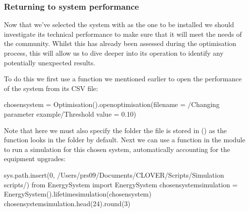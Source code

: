 \documentclass[letterpaper,10pt,english]{sphinxmanual}
\begin{document}
\subsubsection{Returning to system performance}
\label{\detokenize{optimisation:returning-to-system-performance}}
\sphinxAtStartPar
Now that we’ve selected the system with  as the
one to be installed we should investigate its technical performance to
make sure that it will meet the needs of the community. Whilst this has
already been assessed during the optimisation process, this will allow
us to dive deeper into its operation to identify any potentially
unexpected results.

\sphinxAtStartPar
To do this we first use a function we mentioned earlier to open the
performance of the system from its CSV file:

\begin{sphinxVerbatim}[commandchars=\\\{\}]
chosen\PYGZus{}system = Optimisation().open\PYGZus{}optimisation(filename = \PYGZsq{}/Changing parameter example/Threshold value = 0.10\PYGZsq{})
\end{sphinxVerbatim}

\sphinxAtStartPar
Note that here we must also specify the folder the file is stored in
() as the function looks in the
 folder by default. Next we can use a function in
the  module to run a simulation for this chosen system,
automatically accounting for the equipment upgrades:

\begin{sphinxVerbatim}[commandchars=\\\{\}]
sys.path.insert(0, \PYGZsq{}/Users/prs09/Documents/CLOVER/Scripts/Simulation scripts/\PYGZsq{})
from Energy\PYGZus{}System import Energy\PYGZus{}System
chosen\PYGZus{}system\PYGZus{}simulation = Energy\PYGZus{}System().lifetime\PYGZus{}simulation(chosen\PYGZus{}system)
chosen\PYGZus{}system\PYGZus{}simulation.head(24).round(3)
\end{sphinxVerbatim}

\begin{sphinxVerbatim}[commandchars=\\\{\}]
       

       

       
\end{sphinxVerbatim}
\end{document}
